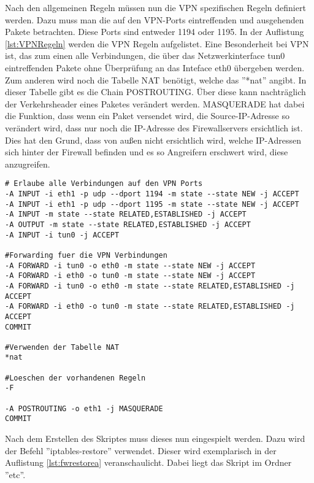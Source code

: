 Nach den allgemeinen Regeln müssen nun die VPN spezifischen Regeln definiert werden. Dazu muss man die auf den VPN-Ports eintreffenden und ausgehenden Pakete betrachten. Diese Ports sind entweder 1194 oder 1195. In der Auflistung \ref{lst:VPNRegeln} werden die VPN Regeln aufgelistet. Eine Besonderheit bei VPN ist, das zum einen alle Verbindungen, die über das Netzwerkinterface tun0 eintreffenden Pakete ohne Überprüfung an das Inteface eth0 übergeben werden. Zum anderen wird noch die Tabelle NAT benötigt, welche das ''*nat'' angibt. In dieser Tabelle gibt es die Chain POSTROUTING. Über diese kann nachträglich der Verkehrsheader eines Paketes verändert werden. MASQUERADE hat dabei die Funktion, dass wenn ein Paket versendet wird, die Source-IP-Adresse so verändert wird, dass nur noch die IP-Adresse des Firewallservers ersichtlich ist. Dies hat den Grund, dass von außen nicht ersichtlich wird, welche IP-Adressen sich hinter der Firewall befinden und es so Angreifern erschwert wird, diese anzugreifen.
\newline
\lstset{
	basicstyle=\footnotesize, frame=tb,
	xleftmargin=.01\textwidth, xrightmargin=.01\textwidth
}
\begin{lstlisting}[caption={Weitere VPN Firewallregeln},label=lst:VPNRegeln]
# Erlaube alle Verbindungen auf den VPN Ports
-A INPUT -i eth1 -p udp --dport 1194 -m state --state NEW -j ACCEPT
-A INPUT -i eth1 -p udp --dport 1195 -m state --state NEW -j ACCEPT
-A INPUT -m state --state RELATED,ESTABLISHED -j ACCEPT
-A OUTPUT -m state --state RELATED,ESTABLISHED -j ACCEPT
-A INPUT -i tun0 -j ACCEPT

#Forwarding fuer die VPN Verbindungen
-A FORWARD -i tun0 -o eth0 -m state --state NEW -j ACCEPT
-A FORWARD -i eth0 -o tun0 -m state --state NEW -j ACCEPT
-A FORWARD -i tun0 -o eth0 -m state --state RELATED,ESTABLISHED -j ACCEPT
-A FORWARD -i eth0 -o tun0 -m state --state RELATED,ESTABLISHED -j ACCEPT
COMMIT

#Verwenden der Tabelle NAT
*nat

#Loeschen der vorhandenen Regeln
-F

-A POSTROUTING -o eth1 -j MASQUERADE
COMMIT
\end{lstlisting}
\vspace{\baselineskip}
Nach dem Erstellen des Skriptes muss dieses nun eingespielt werden. Dazu wird der Befehl ''iptables-restore'' verwendet. Dieser wird exemplarisch in der Auflistung \ref{lst:fwrestorea} veranschaulicht. Dabei liegt das Skript im Ordner ''etc''.
\newline
